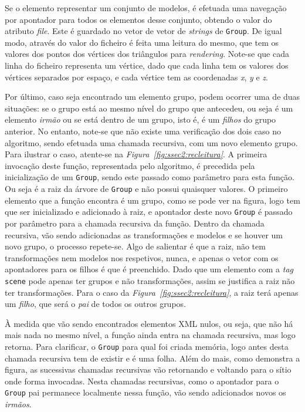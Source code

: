 Se o elemento representar um conjunto de modelos, é efetuada uma navegação por
apontador para todos os elementos desse conjunto, obtendo o valor do atributo
\emph{file}. Este é guardado no vetor de vetor de \emph{strings} de
\texttt{Group}. De igual modo, através do valor do ficheiro é feita uma leitura
do mesmo, que tem os valores dos pontos dos vértices dos triângulos para
\emph{rendering}. Note-se que cada linha do ficheiro representa um vértice,
dado que cada linha tem os valores dos vértices separados por espaço,
e cada vértice tem as coordenadas \emph{x}, \emph{y} e \emph{z}. 

Por último, caso seja encontrado um elemento grupo, podem ocorrer uma de duas
situações: se o grupo está ao mesmo nível do grupo que antecedeu, ou seja é um
elemento \emph{irmão} ou se está dentro de um grupo, isto é, é um \emph{filhos}
do grupo anterior. No entanto, note-se que não existe uma verificação dos dois
caso no algoritmo, sendo efetuada uma chamada recursiva, com um novo elemento
grupo. Para ilustrar o caso, atente-se na
\emph{Figura~\ref{fig:ssec2:recleitura}}. A primeira invocação deste função,
representada pelo algoritmo, é precedida pela inicialização de um
\texttt{Group}, sendo este passado como parâmetro para esta função. Ou seja
é a raiz da árvore de \texttt{Group} e não possui quaisquer valores. O primeiro
elemento que a função encontra é um grupo, como se pode ver na figura, logo tem
que ser inicializado e adicionado à raiz, e apontador deste novo \texttt{Group}
é passado por parâmetro para a chamada recursiva da função. Dentro da chamada
recursiva, vão sendo adicionadas as transformações e modelos e se houver um novo
grupo, o processo repete-se. Algo de salientar é que a raiz, não tem
transformações nem modelos nos respetivos, nunca, e apenas o vetor com os
apontadores para os filhos é que é preenchido. Dado que um elemento com
a \emph{tag} \texttt{scene} pode apenas ter grupos e não transformações, assim
se justifica a raiz não ter transformações. Para o caso da
\emph{Figura~\ref{fig:ssec2:recleitura}}, a raiz terá apenas um \emph{filho},
que será o \emph{pai} de todos os outros grupos.   

À medida que vão sendo encontrados elementos XML nulos, ou seja, que não há mais
nada no mesmo nível, a função ainda entra na chamada recursiva, mas logo
retorna. Para clarificar, o \texttt{Group} para qual foi criada memória, logo
antes desta chamada recursiva tem de existir e é uma folha. Além do mais, como
demonstra a figura, as sucessivas chamadas recursivas vão retornando e voltando
para o sítio onde forma invocadas. Nesta chamadas recursivas, como o apontador
para o \texttt{Group} pai permanece localmente nessa função, vão sendo
adicionados novos os \emph{irmãos}. 


